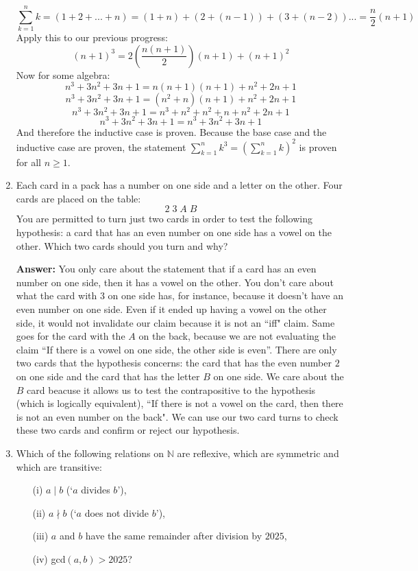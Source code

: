 \documentclass[11pt]{article}
\begin{document}
\begin{enumerate}
\[\sum_{k=1}^{n} k = (1+2+...+n) = (1+n)+(2+(n-1))+ (3+(n-2))...  = \frac{n}{2}(n+1) \]
Apply this to our previous progress:
\[ (n+1)^3 = 2(\frac{n(n+1)}{2})(n+1) + (n+1)^2\]
Now for some algebra:
\[ n^3 + 3n^2 +3n + 1 = n(n+1)(n+1)+ n^2 + 2n + 1 \]
\[ n^3 + 3n^2 +3n + 1 = (n^2+n)(n+1) + n^2 + 2n + 1\]
\[ n^3 + 3n^2 +3n + 1 = n^3 + n^2 + n^2 + n + n^2 + 2n + 1\]
\[ n^3 + 3n^2 +3n + 1 = n^3 + 3n^2 + 3n + 1\] 
And therefore the inductive case is proven. Because the base case and the inductive case are proven, the statement $\sum_{k=1}^n k^3 = \left(\sum_{k=1}^n k\right)^2$ is proven for all $n \geq 1$.

\rightline{$\Box$}
\item
Each card in a pack has a number on one side and a letter on the other. Four cards are
placed on the table:
\[ \boxed{2} \; \boxed{3} \; \boxed{A} \; \boxed{B}\]
You are permitted to turn just two cards in order to test the following hypothesis: a card that
has an even number on one side has a vowel on the other. Which two cards should you turn and why? 

\bigskip\textbf{Answer: } You only care about the statement that if a card has an even number on one side, then it has a vowel on the other. You don't care about what the card with 3 on one side has, for instance, because it doesn't have an even number on one side. Even if it ended up having a vowel on the other side, it would not invalidate our claim because it is not an ``iff" claim. Same goes for the card with the $A$ on the back, because we are not evaluating the claim ``If there is a vowel on one side, the other side is even''. There are only two cards that the hypothesis concerns: the card that has the even number $2$ on one side and the card that has the letter $B$ on one side. We care about the $B$ card beacuse it allows us to test the contrapositive to the hypothesis (which is logically equivalent), ``If there is not a vowel on the card, then there is not an even number on the back". We can use our two card turns to check these two cards and confirm or reject our hypothesis. 

\item
Which of the following relations on $\mathbb{N}$ are reflexive, which are symmetric and which are transitive:
\begin{itemize}
\item[(i)] $a \mid b$ (`$a$ divides $b$'),
\item[(ii)] $a \nmid b$ (`$a$ does not divide $b$'),
\item[(iii)] $a$ and $b$ have the same remainder after division by $2025$,
\item[(iv)] gcd$(a, b) > 2025$?
\end{itemize}

\end{enumerate}
\end{document}
